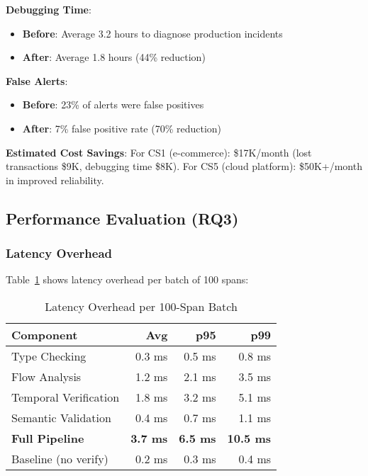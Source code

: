 \textbf{Debugging Time}:
\begin{itemize}
\item \textbf{Before}: Average 3.2 hours to diagnose production incidents
\item \textbf{After}: Average 1.8 hours (44\% reduction)
\end{itemize}

\textbf{False Alerts}:
\begin{itemize}
\item \textbf{Before}: 23\% of alerts were false positives
\item \textbf{After}: 7\% false positive rate (70\% reduction)
\end{itemize}

\textbf{Estimated Cost Savings}: For CS1 (e-commerce): \$17K/month (lost transactions \$9K, debugging time \$8K). For CS5 (cloud platform): \$50K+/month in improved reliability.

\subsection{Performance Evaluation (RQ3)}
\label{sec:performance}

\subsubsection{Latency Overhead}

Table~\ref{tab:performance} shows latency overhead per batch of 100 spans:

\begin{table}[t]
\caption{Latency Overhead per 100-Span Batch}
\label{tab:performance}
\small
\begin{tabular}{lrrr}
\toprule
\textbf{Component} & \textbf{Avg} & \textbf{p95} & \textbf{p99} \\
\midrule
Type Checking & 0.3 ms & 0.5 ms & 0.8 ms \\
Flow Analysis & 1.2 ms & 2.1 ms & 3.5 ms \\
Temporal Verification & 1.8 ms & 3.2 ms & 5.1 ms \\
Semantic Validation & 0.4 ms & 0.7 ms & 1.1 ms \\
\midrule
\textbf{Full Pipeline} & \textbf{3.7 ms} & \textbf{6.5 ms} & \textbf{10.5 ms} \\
\midrule
Baseline (no verify) & 0.2 ms & 0.3 ms & 0.4 ms \\
\bottomrule
\end{tabular}
\vspace{-0.1in}
\end{table}

